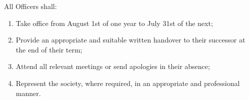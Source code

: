 \item All Officers shall:
\begin{enumerate}[label*=\arabic*.]
    \item Take office from August 1st of one year to July 31st of the next;
    \item Provide an appropriate and suitable written handover to their successor at the end of their term;
    \item Attend all relevant meetings or send apologies in their absence;
    \item  Represent the society, where required, in an appropriate and professional manner.
\end{enumerate}
